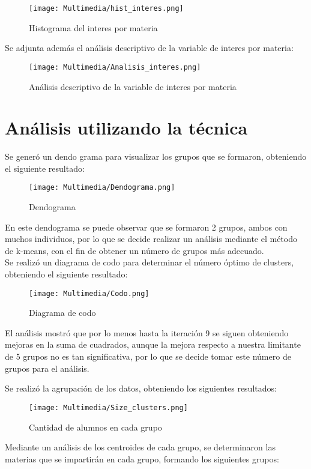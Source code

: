 \documentclass[12pt]{article}
\begin{document}
\begin{figure}[H]
\centering
\texttt{[image: Multimedia/hist\_interes.png]}
\caption{Histograma del interes por materia}
\end{figure}

Se adjunta además el análisis descriptivo de la variable de interes por materia:
\begin{figure}[H]
\centering
\texttt{[image: Multimedia/Analisis\_interes.png]}
\caption{Análisis descriptivo de la variable de interes por materia}
\end{figure}

\newpage

\section{Análisis utilizando la técnica}

Se generó un dendo grama para visualizar los grupos que se formaron, obteniendo el siguiente resultado:
\begin{figure}[H]
\centering
\texttt{[image: Multimedia/Dendograma.png]}
\caption{Dendograma}
\end{figure}

En este dendograma se puede observar que se formaron 2 grupos, ambos con muchos individuos, por lo que se decide realizar un análisis
mediante el método de k-means, con el fin de obtener un número de grupos más adecuado.\\

Se realizó un diagrama de codo para determinar el número óptimo de clusters, obteniendo el siguiente resultado:
\begin{figure}[H]
\centering
\texttt{[image: Multimedia/Codo.png]}
\caption{Diagrama de codo}
\end{figure}

El análisis mostró que por lo menos hasta la iteración 9 se siguen obteniendo mejoras en la suma de cuadrados, aunque la mejora respecto
a nuestra limitante de 5 grupos no es tan significativa, por lo que se decide tomar este número de grupos para el análisis.

\noindent Se realizó la agrupación de los datos, obteniendo los siguientes resultados:
\begin{figure}[H]
\centering
\texttt{[image: Multimedia/Size\_clusters.png]}
\caption{Cantidad de alumnos en cada grupo}
\end{figure}

Mediante un análisis de los centroides de cada grupo, se determinaron las materias que se impartirán en cada grupo, formando
los siguientes grupos:
\end{document}
